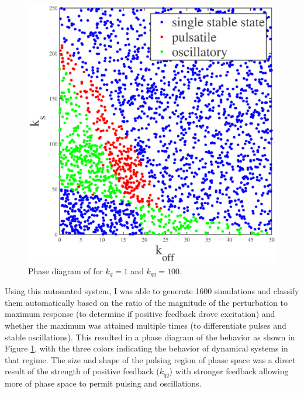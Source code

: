 \begin{figure}[h!]
	\centering
	\includegraphics[width=\hsize]{pulse/k_phase.eps}
	\caption{\label{fig:pulse_k_phase}  Phase diagram of for $k_q=1$ and $k_{qq}=100$.}
\end{figure}

Using this automated system, I was able to generate 1600 simulations and classify them automatically based on the ratio of the magnitude of the perturbation to maximum response (to determine if positive feedback drove excitation) and whether the maximum was attained multiple times (to differentiate pulses and stable oscillations).  This resulted in a phase diagram of the behavior as shown in Figure \ref{fig:pulse_k_phase}, with the three colors indicating the behavior of dynamical systems in that regime.  The size and shape of the pulsing region of phase space was a direct result of the strength of positive feedback ($k_{qq}$)  with stronger feedback allowing more of phase space to permit pulsing and oscillations.

